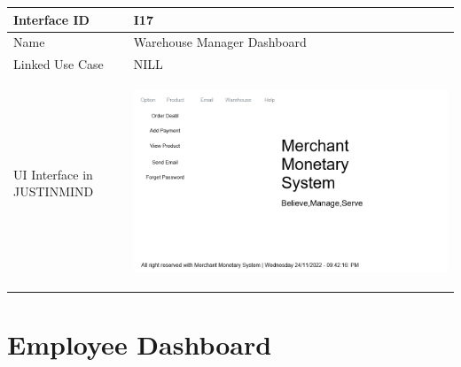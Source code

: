 \documentclass[12pt,a4paper]{report}
\begin{document}
\begin{tabular}{ | m{3cm} | m{12cm}| } \hline

Interface ID &  I17 \\\hline

Name  &  Warehouse Manager Dashboard \\ \hline

Linked Use Case & NILL \\ \hline

UI Interface in JUSTINMIND & \begin{center} \includegraphics[scale=0.3]{./User Interface/UI-016 Warehouse Manager Dashboard@1x.png}\end{center}  \\ \hline


\end{tabular} 
\section{Employee Dashboard }
\end{document}
